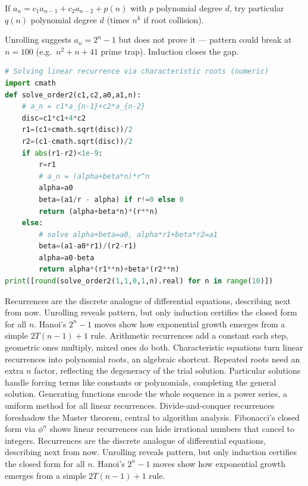\begin{theorem}
If $a_n=c_1a_{n-1}+c_2a_{n-2}+p(n)$ with $p$ polynomial degree $d$, try particular $q(n)$ polynomial degree $d$ (times $n^k$ if root collision).
\end{theorem}

\begin{remark}
Unrolling suggests $a_n=2^n-1$ but does not prove it --- pattern could break at $n=100$ (e.g.\ $n^2+n+41$ prime trap). Induction closes the gap.
\end{remark}

\begin{lstlisting}[language=Python]
# Solving linear recurrence via characteristic roots (numeric)
import cmath
def solve_order2(c1,c2,a0,a1,n):
    # a_n = c1*a_{n-1}+c2*a_{n-2}
    disc=c1*c1+4*c2
    r1=(c1+cmath.sqrt(disc))/2
    r2=(c1-cmath.sqrt(disc))/2
    if abs(r1-r2)<1e-9:
        r=r1
        # a_n = (alpha+beta*n)*r^n
        alpha=a0
        beta=(a1/r - alpha) if r!=0 else 0
        return (alpha+beta*n)*(r**n)
    else:
        # solve alpha+beta=a0, alpha*r1+beta*r2=a1
        beta=(a1-a0*r1)/(r2-r1)
        alpha=a0-beta
        return alpha*(r1**n)+beta*(r2**n)
print([round(solve_order2(1,1,0,1,n).real) for n in range(10)])
\end{lstlisting}

Recurrences are the discrete analogue of differential equations, describing next from now.
Unrolling reveals pattern, but only induction certifies the closed form for all $n$.
Hanoi's $2^n-1$ moves show how exponential growth emerges from a simple $2T(n-1)+1$ rule.
Arithmetic recurrences add a constant each step, geometric ones multiply, mixed ones do both.
Characteristic equations turn linear recurrences into polynomial roots, an algebraic shortcut.
Repeated roots need an extra $n$ factor, reflecting the degeneracy of the trial solution.
Particular solutions handle forcing terms like constants or polynomials, completing the general solution.
Generating functions encode the whole sequence in a power series, a uniform method for all linear recurrences.
Divide-and-conquer recurrences foreshadow the Master theorem, central to algorithm analysis.
Fibonacci's closed form via $\phi^n$ shows linear recurrences can hide irrational numbers that cancel to integers.
Recurrences are the discrete analogue of differential equations, describing next from now.
Unrolling reveals pattern, but only induction certifies the closed form for all $n$.
Hanoi's $2^n-1$ moves show how exponential growth emerges from a simple $2T(n-1)+1$ rule.

